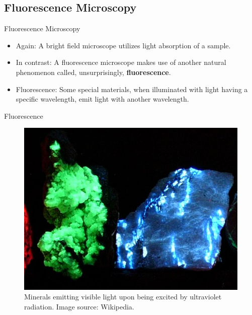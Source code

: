 \subsection{Fluorescence Microscopy}
\begin{frame}[c]{Fluorescence Microscopy}
	\begin{itemize}
		\setlength\itemsep{0.4cm}
		\item<1-> Again: A bright field microscope utilizes light absorption of a sample.
		\item<2-> In contrast: A fluorescence microscope makes use of another natural phenomenon called, unsurprisingly, \textbf{fluorescence}.
		\item<3-> Fluorescence: Some special materials, when illuminated with light having a specific wavelength, emit light with another wavelength.
	\end{itemize}
\end{frame}
\begin{frame}{Fluorescence}
	\begin{figure}
		\centering
		\includegraphics[height=0.8\textheight]{images/minerals}
		\caption{Minerals emitting visible light upon being excited by ultraviolet radiation. Image source: Wikipedia.}
	\end{figure}
\end{frame}
